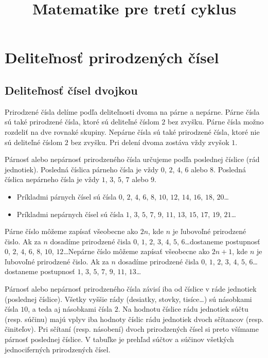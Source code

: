 \documentclass{report}
\title{Matematike pre tretí cyklus}
\begin{document}
\maketitle

\chapter{Deliteľnosť prirodzených čísel}

\section{Deliteľnosť čísel dvojkou}

Prirodzené čísla delíme podľa deliteľnosti dvoma na párne a nepárne. Párne čísla sú také prirodzené čísla, ktoré sú deliteľné číslom \(2\) bez zvyšku. Párne čísla možno rozdeliť na dve rovnaké skupiny. Nepárne čísla sú také prirodzené čísla, ktoré nie sú deliteľné číslom \(2\) bez zvyšku. Pri delení dvoma zostáva vždy zvyšok \(1\).

Párnosť alebo nepárnosť prirodzeného čísla určujeme podľa poslednej číslice (rád jednotiek). Posledná číslica párneho čísla je vždy \(0\), \(2\), \(4\), \(6\) alebo \(8\). Posledná číslica nepárneho čísla je vždy \(1\), \(3\), \(5\), \(7\) alebo \(9\).
\begin{itemize}
  \item Príkladmi párnych čísel sú čísla \(0\), \(2\), \(4\), \(6\), \(8\), \(10\), \(12\), \(14\), \(16\), \(18\), \(20\)\dots
  \item Príkladmi nepárnych čísel sú čísla \(1\), \(3\), \(5\), \(7\), \(9\), \(11\), \(13\), \(15\), \(17\), \(19\), \(21\)\dots
\end{itemize}

Párne číslo môžeme zapísať všeobecne ako \(2n\), kde \(n\) je ľubovoľné prirodzené čislo. Ak za \(n\) dosadíme prirodzené čisla \(0\), \(1\), \(2\), \(3\), \(4\), \(5\), \(6\)\dots dostaneme postupnosť \(0\), \(2\), \(4\), \(6\), \(8\), \(10\), \(12\)\dots Nepárne číslo môžeme zapísať všeobecne ako \(2n+1\), kde \(n\) je ľubovoľné prirodzené čislo. Ak za \(n\) dosadíme prirodzené čisla \(0\), \(1\), \(2\), \(3\), \(4\), \(5\), \(6\)\dots dostaneme postupnosť \(1\), \(3\), \(5\), \(7\), \(9\), \(11\), \(13\)\dots

Párnosť alebo nepárnosť prirodzeného čísla závisí iba od číslice v ráde jednotiek (poslednej číslice). Všetky vyššie rády (desiatky, stovky, tisíce\dots) sú násobkami čísla \(10\), a teda aj násobkami čísla \(2\). Na hodnotu číslice rádu jednotiek súčtu (resp. súčinu) majú vplyv iba hodnoty číslic rádu jednotiek dvoch sčítancov (resp. činiteľov). Pri sčítaní (resp. násobení) dvoch prirodzených čísel si preto všímame párnosť poslednej číslice. V tabuľke je prehľad súčtov a súčinov všetkých jednociferných prirodzených čísel.
\end{document}
